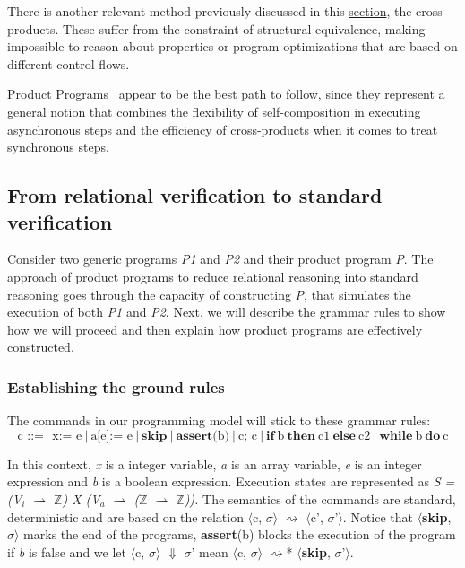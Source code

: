 There is another relevant method previously discussed in this \hyperref[sec:cross_products]{section}, the cross-products.
These suffer from the constraint of structural equivalence, making impossible to reason about properties or program optimizations that are based on different control flows.

Product Programs~\cite{DBLP:conf/fm/BartheCK11} appear to be the best path to follow, since they represent a general notion that combines the flexibility of self-composition in executing asynchronous steps and the efficiency of cross-products when it comes to treat synchronous steps. 


\subsection{From relational verification to standard verification} 
\label{subsec:product_programs_relverif_to_stdverif}

Consider two generic programs \emph{P1} and \emph{P2} and their product program \emph{P}.
The approach of product programs to reduce relational reasoning into standard reasoning goes through the capacity of constructing \emph{P}, that simulates the execution of both \emph{P1} and \emph{P2}.
Next, we will describe the grammar rules to show how we will proceed and then explain how product programs are effectively constructed.

\subsubsection{Establishing the ground rules} 
\label{subsubsec:product_programs_ground_rules}

The commands in our programming model will stick to these grammar rules:
\[ \text{c ::=} \ \ \ \text{x:= e} \ | \ \text{a[e]:= e} \ | \ \textbf{skip} \ | \ \textbf{assert} \text{(b)} \ |
                    \ \text{c; c} \ | \ \textbf{if} \ \text{b} \ \textbf{then} \ \text{c1} \ \textbf{else} \ \text{c2} \ | \ \textbf{while} \ \text{b} \ \textbf{do} \ \text{c} \]

In this context, \emph{x} is a integer variable, \emph{a} is an array variable, \emph{e} is an integer expression and \emph{b} is a boolean expression.
Execution states are represented as \emph{S = (V$_i$ $\rightharpoonup$ $\mathbb{Z}$) X (V$_a$ $\rightharpoonup$ ($\mathbb{Z}$ $\rightharpoonup$ $\mathbb{Z}$)).}
The semantics of the commands are standard, deterministic and are based on the relation $\langle$c, $\sigma$$\rangle$ $\rightsquigarrow$ $\langle$c', $\sigma$'$\rangle$.
Notice that $\langle$\textbf{skip}, $\sigma$$\rangle$ marks the end of the programs, \textbf{assert}(b) blocks the execution of the program if \emph{b} is false and we let $\langle$c, $\sigma$$\rangle$ $\Downarrow$ $\sigma$' mean $\langle$c, $\sigma$$\rangle$ $\rightsquigarrow$* $\langle$\textbf{skip}, $\sigma$'$\rangle$.

